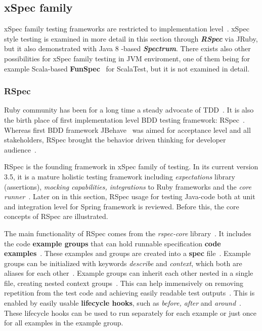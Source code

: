     \subsection{xSpec family}
    xSpec family testing frameworks are restricted to implementation level~\cite{solis2011study}. xSpec style testing
    is examined in more detail in this section through \textbf{\textit{RSpec}} via JRuby, but it also demonstrated with
    Java 8 -based \textbf{\textit{Spectrum}}. There exists also other possibilities for xSpec family testing in JVM enviroment,
    one of them being for example Scala-based \textbf{FunSpec}~\cite{funspec} for ScalaTest, but it is not examined in detail.

    \subsubsection{RSpec}
    Ruby community has been for a long time a steady advocate of TDD~\cite{lerner2009forge}. It is also the birth place
    of first implementation level BDD testing framework: RSpec~\cite{astels2006new}. Whereas first BDD framework
    JBehave~\cite{bdd2006north} was aimed for acceptance level and all stakeholders, RSpec brought the behavior driven thinking for developer
    audience~\cite{astels2006new}.

    RSpec is the founding framework in xSpec family of testing. In its current version 3.5, it is a mature holistic testing
    framework including \textit{expectations} library (assertions), \textit{mocking capabilities, integrations} to Ruby frameworks and the \textit{core runner}~\cite{rspecdoc}.
    Later on in this section, RSpec usage for testing Java-code both at unit and integration level for Spring framework is reviewed.
    Before this, the core concepts of RSpec are illustrated.

    The main functionality of RSpec comes from the \textit{rspec-core} library~\cite{rspecdoc}. It includes the code \textbf{example groups} that can hold runnable
    specification \textbf{code examples}~\cite{chelimsky2010rspec}. These examples and groups are created into a \textbf{spec} file~\cite{chelimsky2010rspec}.
    Example groups can be initialized with keywords \textit{describe}
    and \textit{context}, which both are aliases for each other~\cite{rspec-core}. Example groups can inherit each other nested in a single
    file, creating nested context groups~\cite{rspec-core}. This can help immensively on removing
    repetition from the test code
    and achieving easily readable test outputs~\cite{chelimsky2010rspec}. This is enabled by easily usable \textbf{lifecycle hooks},
    such as \textit{before, after} and \textit{around}~\cite{chelimsky2010rspec}.
    These lifecycle hooks can be used to run separately for each example or just once for all examples in the example group.

